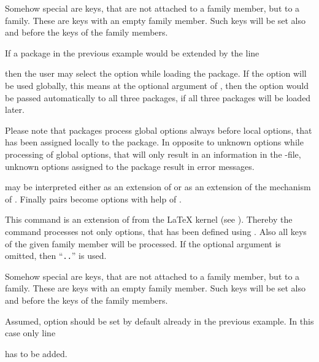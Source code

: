 Somehow special are keys, that are not attached to a family member, but to a
family. These are keys with an empty family member. Such keys will be set also
and before the keys of the family members.
\begin{Example}
  If a package in the previous example would be extended by the line
\begin{lstcode}
\end{lstcode}
  then the user may select the option  while loading the
  package. If the option will be used globally, this means at the optional
  argument of , then the option would be passed
  automatically to all three packages, if all three packages will be loaded
  later.
\end{Example}
Please note that packages process global options always
before local options, that has been assigned locally to the package. In
opposite to unknown options while processing of global options, that will only
result in an information in the -file, unknown options assigned to
the package result in error messages.

 may be interpreted either as an extension of
 or as an extension of the  mechanism
of . Finally  pairs become options with help
of .%
%
%


\begin{Declaration}
\end{Declaration}
%
This command is an extension of  from the \LaTeX{}
kernel (see \cite{latex:clsguide}). Thereby the command processes not only
options, that has been defined using . Also all keys of
the given family member will be processed. If the optional argument
 is omitted, then
``\texttt{.}\texttt{.}'' is used.

Somehow special are keys, that are not attached to a family member, but to a
family. These are keys with an empty family member. Such keys will be set also
and before the keys of the family members.
\begin{Example}
  Assumed, option  should be set by default already in the
  previous example. In this case only line
\begin{lstcode}
\end{lstcode}
  has to be added.
\end{Example}
%
%


